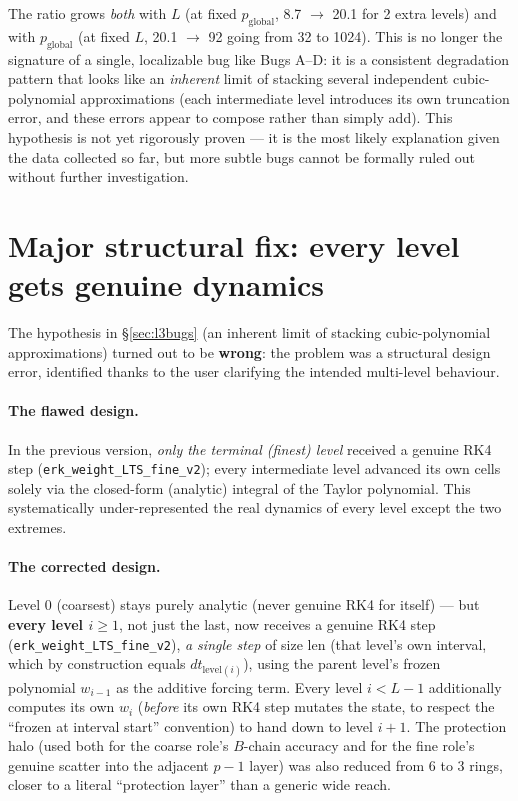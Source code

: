 \documentclass[11pt]{article}
\newcommand{\code}[1]{\texttt{#1}}
\begin{document}
The ratio grows \emph{both} with $L$ (at fixed $p_{\text{global}}$, 8.7
$\to$ 20.1 for 2 extra levels) and with $p_{\text{global}}$ (at fixed
$L$, 20.1 $\to$ 92 going from 32 to 1024). This is no longer the
signature of a single, localizable bug like Bugs A--D: it is a
consistent degradation pattern that looks like an \emph{inherent} limit
of stacking several independent cubic-polynomial approximations (each
intermediate level introduces its own truncation error, and these errors
appear to compose rather than simply add). This hypothesis is not yet
rigorously proven --- it is the most likely explanation given the data
collected so far, but more subtle bugs cannot be formally ruled out
without further investigation.

\section{Major structural fix: every level gets genuine dynamics}
\label{sec:realrk4}

The hypothesis in \S\ref{sec:l3bugs} (an inherent limit of stacking
cubic-polynomial approximations) turned out to be \textbf{wrong}: the
problem was a structural design error, identified thanks to the user
clarifying the intended multi-level behaviour.

\paragraph{The flawed design.} In the previous version, \emph{only the
terminal (finest) level} received a genuine RK4 step
(\code{erk\_weight\_LTS\_fine\_v2}); every intermediate level advanced
its own cells solely via the closed-form (analytic) integral of the
Taylor polynomial. This systematically under-represented the real
dynamics of every level except the two extremes.

\paragraph{The corrected design.} Level 0 (coarsest) stays purely
analytic (never genuine RK4 for itself) --- but \textbf{every level
$i\geq1$}, not just the last, now receives a genuine RK4 step
(\code{erk\_weight\_LTS\_fine\_v2}), \emph{a single step} of size
$\mathrm{len}$ (that level's own interval, which by construction equals
$dt_{\text{level}(i)}$), using the parent level's frozen polynomial
$w_{i-1}$ as the additive forcing term. Every level $i<L-1$ additionally
computes its own $w_i$ (\emph{before} its own RK4 step mutates the
state, to respect the ``frozen at interval start'' convention) to hand
down to level $i+1$. The protection halo (used both for the coarse
role's $B$-chain accuracy and for the fine role's genuine scatter into
the adjacent $p{-}1$ layer) was also reduced from 6 to 3 rings, closer
to a literal ``protection layer'' than a generic wide reach.
\end{document}

